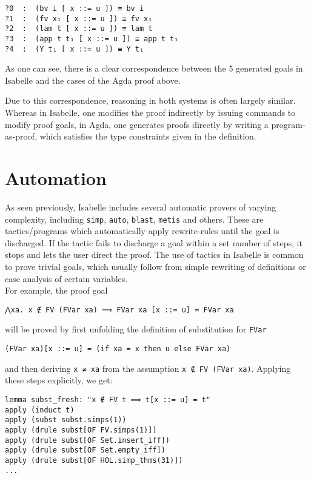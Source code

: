 \documentclass[a4paper, 12pt, twoside]{style/ociamthesis}
\theoremstyle{plain}
\theoremstyle{definition}
\theoremstyle{remark}
\begin{document}
\begin{verbatim}
?0  :  (bv i [ x ::= u ]) ≡ bv i
?1  :  (fv x₁ [ x ::= u ]) ≡ fv x₁
?2  :  (lam t [ x ::= u ]) ≡ lam t
?3  :  (app t t₁ [ x ::= u ]) ≡ app t t₁
?4  :  (Y t₁ [ x ::= u ]) ≡ Y t₁
\end{verbatim}

As one can see, there is a clear correspondence between the 5 generated
goals in Isabelle and the cases of the Agda proof above.

Due to this correspondence, reasoning in both systems is often largely
similar. Whereas in Isabelle, one modifies the proof indirectly by
issuing commands to modify proof goals, in Agda, one generates proofs
directly by writing a program-as-proof, which satisfies the type
constraints given in the definition.

\section{Automation}\label{automation}

As seen previously, Isabelle includes several automatic provers of
varying complexity, including \texttt{simp}, \texttt{auto},
\texttt{blast}, \texttt{metis} and others. These are tactics/programs
which automatically apply rewrite-rules until the goal is discharged. If
the tactic fails to discharge a goal within a set number of steps, it
stops and lets the user direct the proof. The use of tactics in Isabelle
is common to prove trivial goals, which usually follow from simple
rewriting of definitions or case analysis of certain variables.\\
For example, the proof goal

\begin{verbatim}
⋀xa. x ∉ FV (FVar xa) ⟹ FVar xa [x ::= u] = FVar xa
\end{verbatim}

will be proved by first unfolding the definition of substitution for
\texttt{FVar}

\begin{verbatim}
(FVar xa)[x ::= u] = (if xa = x then u else FVar xa)
\end{verbatim}

and then deriving \texttt{x ≠ xa} from the assumption
\texttt{x ∉ FV (FVar xa)}. Applying these steps explicitly, we get:

\begin{verbatim}
lemma subst_fresh: "x ∉ FV t ⟹ t[x ::= u] = t"
apply (induct t)
apply (subst subst.simps(1))
apply (drule subst[OF FV.simps(1)])
apply (drule subst[OF Set.insert_iff])
apply (drule subst[OF Set.empty_iff])
apply (drule subst[OF HOL.simp_thms(31)])
...
\end{verbatim}
\end{document}
